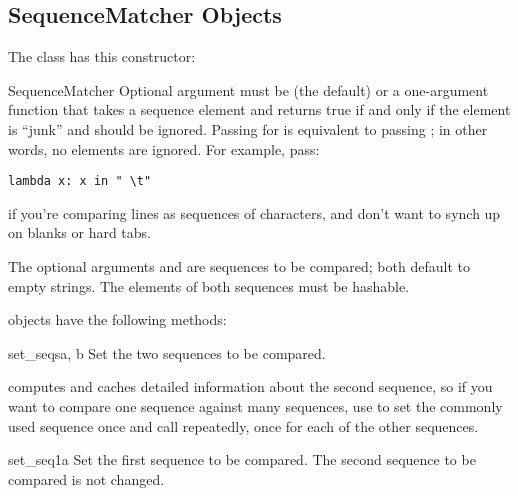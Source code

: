 \begin{seealso}
\end{seealso}


\subsection{SequenceMatcher Objects \label{sequence-matcher}}

The  class has this constructor:

\begin{classdesc}{SequenceMatcher}{}
  Optional argument  must be  (the default) or
  a one-argument function that takes a sequence element and returns
  true if and only if the element is ``junk'' and should be ignored.
  Passing  for  is equivalent to passing
  ; in other words, no elements are ignored.  For
  example, pass:

\begin{verbatim}
lambda x: x in " \t"
\end{verbatim}

  if you're comparing lines as sequences of characters, and don't want
  to synch up on blanks or hard tabs.

  The optional arguments  and  are sequences to be
  compared; both default to empty strings.  The elements of both
  sequences must be hashable.
\end{classdesc}


 objects have the following methods:

\begin{methoddesc}{set_seqs}{a, b}
  Set the two sequences to be compared.
\end{methoddesc}

 computes and caches detailed information about
the second sequence, so if you want to compare one sequence against
many sequences, use  to set the commonly used
sequence once and call  repeatedly, once for each
of the other sequences.

\begin{methoddesc}{set_seq1}{a}
  Set the first sequence to be compared.  The second sequence to be
  compared is not changed.
\end{methoddesc}

